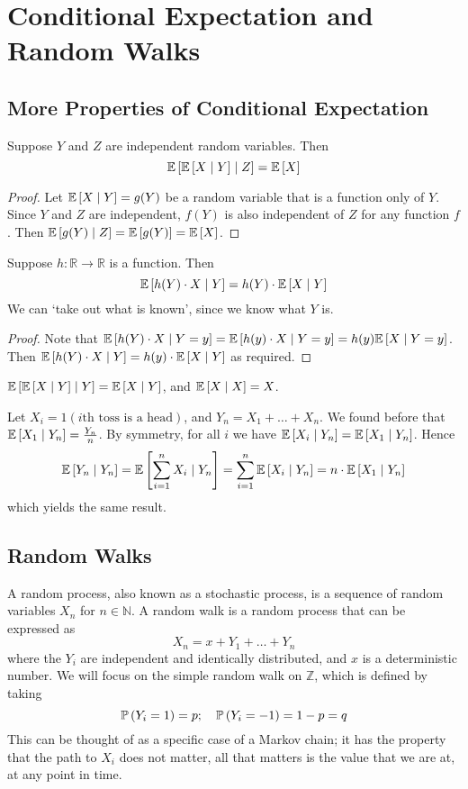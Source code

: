 \documentclass{article}
\begin{document}
\section{Conditional Expectation and Random Walks}
\subsection{More Properties of Conditional Expectation}
\begin{proposition}
    Suppose $Y$ and $Z$ are independent random variables. Then
    \[ \mathbb{E}\left[{\mathbb{E}\left[{X \mid Y}\right] \mid Z}\right] = \mathbb{E}\left[{X}\right] \]
\end{proposition}
\begin{proof}
    Let $\mathbb{E}\left[{X \mid Y}\right] = g(Y)$ be a random variable that is a function only of $Y$. Since $Y$ and $Z$ are independent, $f(Y)$ is also independent of $Z$ for any function $f$. Then $\mathbb{E}\left[{g(Y) \mid Z}\right] = \mathbb{E}\left[{g(Y)}\right] = \mathbb{E}\left[{X}\right]$.
\end{proof}
\begin{proposition}
    Suppose $h \colon \mathbb R \to \mathbb R$ is a function. Then
    \[ \mathbb{E}\left[{h(Y) \cdot X \mid Y}\right] = h(Y) \cdot \mathbb{E}\left[{X \mid Y}\right] \]
    We can `take out what is known', since we know what $Y$ is.
\end{proposition}
\begin{proof}
    Note that $\mathbb{E}\left[{h(Y) \cdot X \mid Y = y}\right] = \mathbb{E}\left[{h(y) \cdot X \mid Y = y}\right] = h(y) \mathbb{E}\left[{X \mid Y = y}\right]$. Then $\mathbb{E}\left[{h(Y) \cdot X \mid Y}\right] = h(y) \cdot \mathbb{E}\left[{X \mid Y}\right]$ as required.
\end{proof}
\begin{corollary}
    $\mathbb{E}\left[{\mathbb{E}\left[{X \mid Y}\right] \mid Y}\right] = \mathbb{E}\left[{X \mid Y}\right]$, and $\mathbb{E}\left[{X \mid X}\right] = X$.
\end{corollary}
\noindent Let $X_i = 1(i\text{th toss is a head})$, and $Y_n = X_1 + \dots + X_n$. We found before that $\mathbb{E}\left[{X_1 \mid Y_n}\right] = \frac{Y_n}{n}$. By symmetry, for all $i$ we have $\mathbb{E}\left[{X_i \mid Y_n}\right] = \mathbb{E}\left[{X_1 \mid Y_n}\right]$. Hence
\[ \mathbb{E}\left[{Y_n \mid Y_n}\right] = \mathbb{E}\left[{\sum_{i=1}^n X_i \mid Y_n}\right] = \sum_{i=1}^n \mathbb{E}\left[{X_i \mid Y_n}\right] = n \cdot \mathbb{E}\left[{X_1 \mid Y_n}\right] \]
which yields the same result.

\subsection{Random Walks}
A random process, also known as a stochastic process, is a sequence of random variables $X_n$ for $n \in \mathbb N$. A random walk is a random process that can be expressed as
\[ X_n = x + Y_1 + \dots + Y_n \]
where the $Y_i$ are independent and identically distributed, and $x$ is a deterministic number. We will focus on the simple random walk on $\mathbb Z$, which is defined by taking
\[ \mathbb{P}\left({Y_i = 1}\right) = p;\quad \mathbb{P}\left({Y_i = -1}\right) = 1-p = q \]
This can be thought of as a specific case of a Markov chain; it has the property that the path to $X_i$ does not matter, all that matters is the value that we are at, at any point in time.
\end{document}
